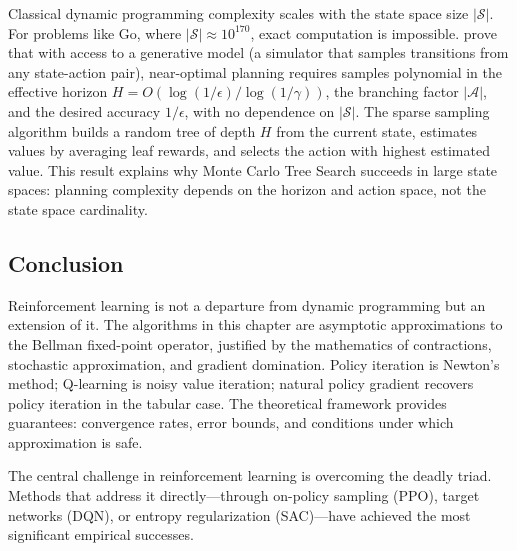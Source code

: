 Classical dynamic programming complexity scales with the state space size $|\mathcal{S}|$. For problems like Go, where $|\mathcal{S}| \approx 10^{170}$, exact computation is impossible. \citet{kearns2002} prove that with access to a generative model (a simulator that samples transitions from any state-action pair), near-optimal planning requires samples polynomial in the effective horizon $H = O(\log(1/\epsilon) / \log(1/\gamma))$, the branching factor $|\mathcal{A}|$, and the desired accuracy $1/\epsilon$, with no dependence on $|\mathcal{S}|$. The sparse sampling algorithm builds a random tree of depth $H$ from the current state, estimates values by averaging leaf rewards, and selects the action with highest estimated value. This result explains why Monte Carlo Tree Search succeeds in large state spaces: planning complexity depends on the horizon and action space, not the state space cardinality.


\subsection{Conclusion}
\label{sec:ch2_conclusion}

Reinforcement learning is not a departure from dynamic programming but an extension of it. The algorithms in this chapter are asymptotic approximations to the Bellman fixed-point operator, justified by the mathematics of contractions, stochastic approximation, and gradient domination. Policy iteration is Newton's method; Q-learning is noisy value iteration; natural policy gradient recovers policy iteration in the tabular case. The theoretical framework provides guarantees: convergence rates, error bounds, and conditions under which approximation is safe.

The central challenge in reinforcement learning is overcoming the deadly triad. Methods that address it directly---through on-policy sampling (PPO), target networks (DQN), or entropy regularization (SAC)---have achieved the most significant empirical successes.


